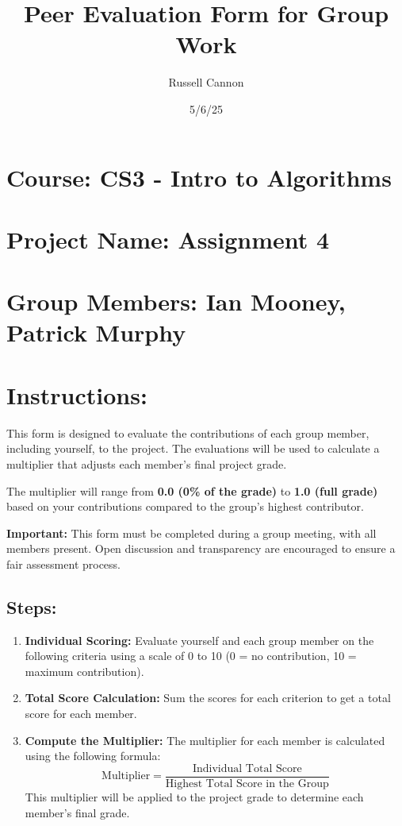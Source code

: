 \documentclass{article}
\title{Peer Evaluation Form for Group Work}
\author{Russell Cannon}
\date{5/6/25}
\begin{document}
\maketitle

\section*{Course: CS3 - Intro to Algorithms}
\vspace{0.5cm}

\section*{Project Name: Assignment 4}
\vspace{0.5cm}

\section*{Group Members: Ian Mooney, Patrick Murphy}
\vspace{1cm}

\section*{Instructions:}

This form is designed to evaluate the contributions of each group member, including yourself, to the project. The evaluations will be used to calculate a multiplier that adjusts each member's final project grade. 

The multiplier will range from \textbf{0.0 (0\% of the grade)} to \textbf{1.0 (full grade)} based on your contributions compared to the group’s highest contributor.

\textbf{Important:} This form must be completed during a group meeting, with all members present. Open discussion and transparency are encouraged to ensure a fair assessment process.

\subsection*{Steps:}

\begin{enumerate}
    \item \textbf{Individual Scoring:} Evaluate yourself and each group member on the following criteria using a scale of 0 to 10 (0 = no contribution, 10 = maximum contribution).
    \item \textbf{Total Score Calculation:} Sum the scores for each criterion to get a total score for each member.
    \item \textbf{Compute the Multiplier:} The multiplier for each member is calculated using the following formula:
    \[
    \text{Multiplier} = \frac{\text{Individual Total Score}}{\text{Highest Total Score in the Group}}
    \]
    This multiplier will be applied to the project grade to determine each member’s final grade.
\end{enumerate}
\end{document}
